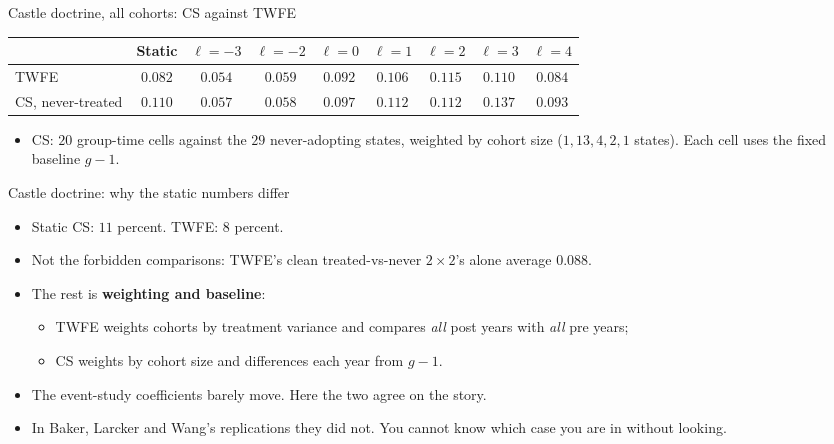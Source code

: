 \documentclass[
  11pt,
  ignorenonframetext,
  aspectratio=169,
]{beamer}
\providecommand{\tightlist}{%
  \setlength{\itemsep}{0pt}\setlength{\parskip}{0pt}}
\begin{document}
\begin{frame}{Castle doctrine, all cohorts: CS against TWFE}
\protect{}\label{castle-doctrine-all-cohorts-cs-against-twfe}
\begin{center}\small
\begin{tabular}{lcccccccc}
\toprule
 & Static & $\ell=-3$ & $\ell=-2$ & $\ell=0$ & $\ell=1$ & $\ell=2$ & $\ell=3$ & $\ell=4$ \\
\midrule
TWFE & $0.082$ & $0.054$ & $0.059$ & $0.092$ & $0.106$ & $0.115$ & $0.110$ & $0.084$ \\
CS, never-treated & $0.110$ & $0.057$ & $0.058$ & $0.097$ & $0.112$ & $0.112$ & $0.137$ & $0.093$ \\
\bottomrule
\end{tabular}
\end{center}

\begin{itemize}
\tightlist
\item
  CS: \(20\) group-time cells against the \(29\) never-adopting states,
  weighted by cohort size (\(1, 13, 4, 2, 1\) states). Each cell uses
  the fixed baseline \(g-1\).
\end{itemize}
\end{frame}

\begin{frame}{Castle doctrine: why the static numbers differ}
\protect{}\label{castle-doctrine-why-the-static-numbers-differ}
\begin{itemize}
\tightlist
\item
  Static CS: \(11\) percent. TWFE: \(8\) percent.
\item
  Not the forbidden comparisons: TWFE's clean treated-vs-never
  \(2 \times 2\)'s alone average \(0.088\).
\item
  The rest is \textbf{weighting and baseline}:

  \begin{itemize}
  \tightlist
  \item
    TWFE weights cohorts by treatment variance and compares \emph{all}
    post years with \emph{all} pre years;
  \item
    CS weights by cohort size and differences each year from \(g - 1\).
  \end{itemize}
\item
  The event-study coefficients barely move. Here the two agree on the
  story.
\item
  In Baker, Larcker and Wang's replications they did not. You cannot
  know which case you are in without looking.
\end{itemize}
\end{frame}
\end{document}
